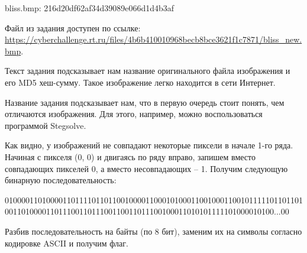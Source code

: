 
bliss.bmp: 216d20df62af34d39089e066d1d4b3af

Файл из задания доступен по ссылке: \url{https://cyberchallenge.rt.ru/files/4b6b410010968becb8bce3621f1c7871/bliss_new.bmp}.

\solutionSection

Текст задания подсказывает нам название оригинального файла изображения и его MD5 хеш-сумму. Такое изображение легко находится в сети Интернет.

Название задания подсказывает нам, что в первую очередь стоит понять, чем отличаются изображения. Для этого, например, можно воспользоваться программой Stegsolve.


Как видно, у изображений не совпадают некоторые пиксели в начале 1-го ряда. Начиная с пикселя (0, 0) и двигаясь по ряду вправо, запишем вместо совпадающих пикселей 0, а вместо несовпадающих – 1. Получим следующую бинарную последовательность:

01000011010000110111101101100100001100010100011001000110010111110110110100110100001101110011011100110011011100100011010101111101000010100...00

Разбив последовательность на байты (по 8 бит), заменим их на символы согласно кодировке ASCII и получим флаг.

